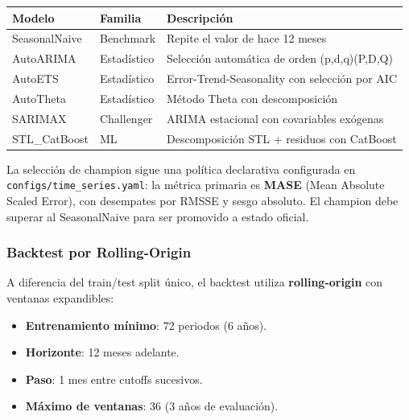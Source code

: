 \documentclass[
  spanish,
  11pt,
  letterpaper,
]{scrbook}
\newcounter{none} %
\providecommand{\tightlist}{%
  \setlength{\itemsep}{0pt}\setlength{\parskip}{0pt}}
\theoremstyle{plain}
\theoremstyle{remark}
\begin{document}
{\def\LTcaptype{none} %
\begin{longtable}[]{@{}
  >{\raggedright\arraybackslash}p{}
  >{\raggedright\arraybackslash}p{}
  >{\raggedright\arraybackslash}p{}@{}}
\toprule\noalign{}
\begin{minipage}[b]{\linewidth}\raggedright
Modelo
\end{minipage} & \begin{minipage}[b]{\linewidth}\raggedright
Familia
\end{minipage} & \begin{minipage}[b]{\linewidth}\raggedright
Descripción
\end{minipage} \\
\midrule\noalign{}
\endhead
\bottomrule\noalign{}
\endlastfoot
SeasonalNaive & Benchmark & Repite el valor de hace 12 meses \\
AutoARIMA & Estadístico & Selección automática de orden
(p,d,q)(P,D,Q) \\
AutoETS & Estadístico & Error-Trend-Seasonality con selección por AIC \\
AutoTheta & Estadístico & Método Theta con descomposición \\
SARIMAX & Challenger & ARIMA estacional con covariables exógenas \\
STL\_CatBoost & ML & Descomposición STL + residuos con CatBoost \\
\end{longtable}
}

La selección de champion sigue una política declarativa configurada en
\texttt{configs/time\_series.yaml}: la métrica primaria es \textbf{MASE}
(Mean Absolute Scaled Error), con desempates por RMSSE y sesgo absoluto.
El champion debe superar al SeasonalNaive para ser promovido a estado
oficial.

\subsubsection{Backtest por
Rolling-Origin}\label{backtest-por-rolling-origin}

A diferencia del train/test split único, el backtest utiliza
\textbf{rolling-origin} con ventanas expandibles:

\begin{itemize}
\tightlist
\item
  \textbf{Entrenamiento mínimo}: 72 periodos (6 años).
\item
  \textbf{Horizonte}: 12 meses adelante.
\item
  \textbf{Paso}: 1 mes entre cutoffs sucesivos.
\item
  \textbf{Máximo de ventanas}: 36 (3 años de evaluación).
\end{itemize}
\end{document}
